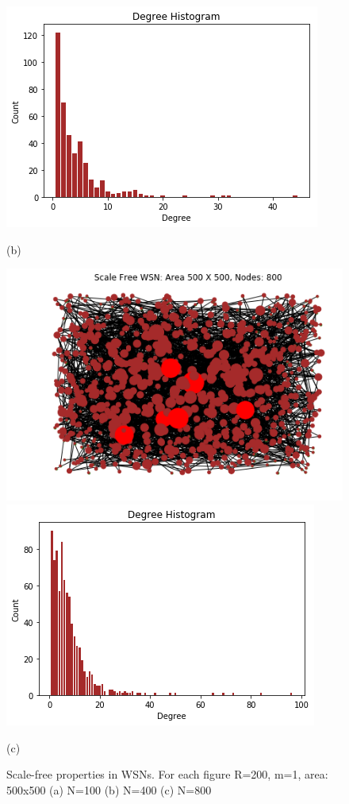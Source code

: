 \documentclass{article}
\begin{document}
\begin{figure}[!htb]
	\includegraphics[width=\linewidth]{Results/400-1(B).png}
	\begin{center}
		(b)
	\end{center}
	\endminipage\hfill
	\includegraphics[width=\linewidth]{Results/800-1.png}
	\includegraphics[width=\linewidth]{Results/800-1(B).png}
	\begin{center}
		(c)
	\end{center}
	\endminipage
	\caption{Scale-free properties in WSNs. For each figure R=200, m=1, area: 500x500 (a) N=100 (b) N=400 (c) N=800}
\end{figure}
\end{document}

